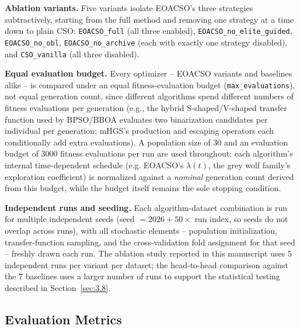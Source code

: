 \textbf{Ablation variants.} Five variants isolate EOACSO's three
strategies subtractively, starting from the full method and removing one
strategy at a time down to plain CSO: \texttt{EOACSO\_full} (all three
enabled), \texttt{EOACSO\_no\_elite\_guided}, \texttt{EOACSO\_no\_obl},
\texttt{EOACSO\_no\_archive} (each with exactly one strategy disabled),
and \texttt{CSO\_vanilla} (all three disabled).

\textbf{Equal evaluation budget.} Every optimizer -- EOACSO variants and
baselines alike -- is compared under an equal fitness-evaluation budget
(\texttt{max\_evaluations}), not equal generation count, since different
algorithms spend different numbers of fitness evaluations per generation
(e.g., the hybrid S-shaped/V-shaped transfer function used by
BPSO/BBOA evaluates two binarization candidates per individual per
generation; mHGS's production and escaping operators each conditionally
add extra evaluations). A population size of 30 and an evaluation budget
of 3000 fitness evaluations per run are used throughout; each algorithm's
internal time-dependent schedule (e.g. EOACSO's $\lambda(t)$, the grey
wolf family's exploration coefficient) is normalized against a
\emph{nominal} generation count derived from this budget, while the
budget itself remains the sole stopping condition.

\textbf{Independent runs and seeding.} Each algorithm-dataset combination
is run for multiple independent seeds (seed $= 2026 + 50 \times$
run index, so seeds do not overlap across runs), with all stochastic
elements -- population initialization, transfer-function sampling, and
the cross-validation fold assignment for that seed -- freshly drawn each
run. The ablation study reported in this manuscript uses 5 independent
runs per variant per dataset; the head-to-head comparison against the 7
baselines uses a larger number of runs to support the statistical testing
described in Section~\ref{sec:3.8}.

\subsection{Evaluation Metrics}
\label{sec:3.7}

